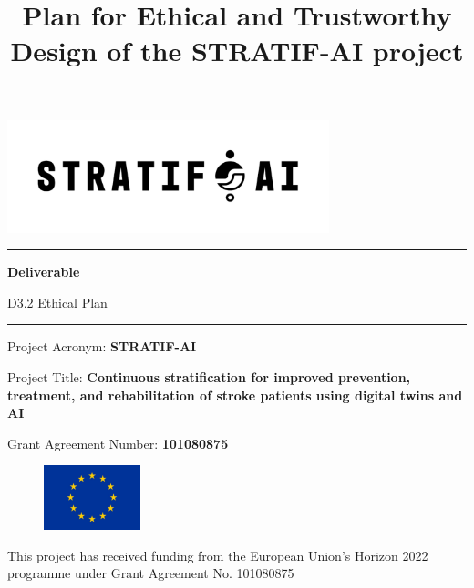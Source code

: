 \documentclass[
  letterpaper,
  DIV=11,
  numbers=noendperiod]{scrreport}
\title{Plan for Ethical and Trustworthy Design of the STRATIF-AI
project}
\author{}
\date{}
\begin{document}
\maketitle
\begin{center}
\includegraphics[width=0.7\textwidth]{stratifai_logo.png}    
\end{center}

\hrule
\vspace{0.2cm}

\begin{center}
\huge \textbf{Deliverable}
\end{center}

\begin{center}
\Large D3.2 Ethical Plan
\end{center}

\vspace{0.2cm}
\hrule

\vspace{0.2cm}

\large \noindent Project Acronym: \textbf{STRATIF-AI}  

\vspace{0.2cm}

\large \noindent Project Title: \textbf{Continuous stratification for improved prevention, treatment, and rehabilitation of stroke patients using digital twins and AI}  

\vspace{0.2cm}

\large \noindent Grant Agreement Number: \textbf{101080875} 

\vspace{0.2cm}

\begin{figure}
  \includegraphics[width=0.25\textwidth]{EU_flag.jpg}
\end{figure}

\noindent \newline \newline \small This project has received funding from the European Union’s Horizon 2022 programme under Grant Agreement No. 101080875
\end{document}
